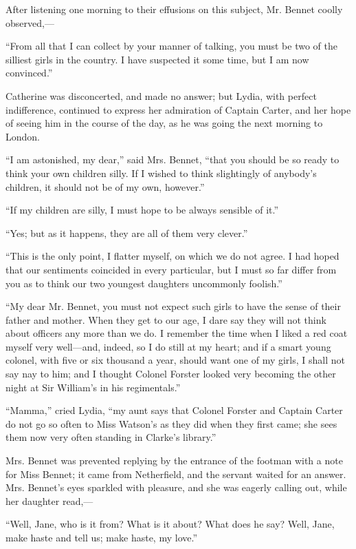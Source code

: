 \documentclass[12pt]{book}
\begin{document}
After listening one morning to their effusions on this subject, Mr. Bennet coolly observed,---

``From all that I can collect by your manner of talking, you must be two of the silliest girls in the country. I have suspected it some time, but I am now convinced.''

Catherine was disconcerted, and made no answer; but Lydia, with perfect indifference, continued to express her admiration of Captain Carter, and her hope of seeing him in the course of the day, as he was going the next morning to London.

``I am astonished, my dear,'' said Mrs. Bennet, ``that you should be so ready to think your own children silly. If I wished to think slightingly of anybody's children, it should not be of my own, however.''

``If my children are silly, I must hope to be always sensible of it.''

``Yes; but as it happens, they are all of them very clever.''

``This is the only point, I flatter myself, on which we do not agree. I had hoped that our sentiments coincided in every particular, but I must so far differ from you as to think our two youngest daughters uncommonly foolish.''

``My dear Mr. Bennet, you must not expect such girls to have the sense of their father and mother. When they get to our age, I dare say they will not think about officers any more than we do. I remember the time when I liked a red coat myself very well---and, indeed, so I do still at my heart; and if a smart young colonel, with five or six thousand a year, should want one of my girls, I shall not say nay to him; and I thought Colonel Forster looked very becoming the other night at Sir William's in his regimentals.''

``Mamma,'' cried Lydia, ``my aunt says that Colonel Forster and Captain Carter do not go so often to Miss Watson's as they did when they first came; she sees them now very often standing in Clarke's library.''

Mrs. Bennet was prevented replying by the entrance of the footman with a note for Miss Bennet; it came from Netherfield, and the servant waited for an answer. Mrs. Bennet's eyes sparkled with pleasure, and she was eagerly calling out, while her daughter read,---

``Well, Jane, who is it from? What is it about? What does he say? Well, Jane, make haste and tell us; make haste, my love.''
\end{document}
